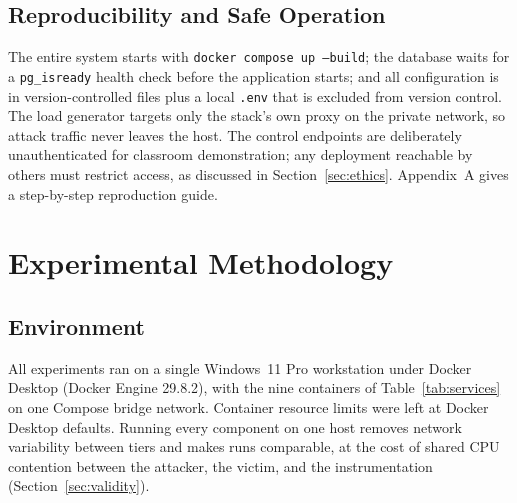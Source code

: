 \documentclass[preprint,12pt]{elsarticle}
\begin{document}
\subsection{Reproducibility and Safe Operation}
The entire system starts with \texttt{docker compose up --build}; the database waits
for a \texttt{pg\_isready} health check before the application starts; and all
configuration is in version-controlled files plus a local \texttt{.env} that is
excluded from version control. The load generator targets only the stack's own proxy
on the private network, so attack traffic never leaves the host. The control endpoints
are deliberately unauthenticated for classroom demonstration; any deployment reachable
by others must restrict access, as discussed in Section~\ref{sec:ethics}. Appendix~A
gives a step-by-step reproduction guide.

\section{Experimental Methodology}
\label{sec:method}

\subsection{Environment}
All experiments ran on a single Windows~11 Pro workstation under Docker Desktop
(Docker Engine 29.8.2), with the nine containers of Table~\ref{tab:services} on one
Compose bridge network. Container resource limits were left at Docker Desktop defaults.
Running every component on one host removes network variability between tiers and
makes runs comparable, at the cost of shared CPU contention between the attacker,
the victim, and the instrumentation (Section~\ref{sec:validity}).
\end{document}
